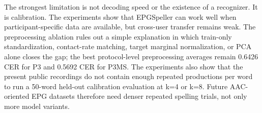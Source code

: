 The strongest limitation is not decoding speed or the existence of a recognizer. It is calibration. The experiments show that EPGSpeller can work well when participant-specific data are available, but cross-user transfer remains weak. The preprocessing ablation rules out a simple explanation in which train-only standardization, contact-rate matching, target marginal normalization, or PCA alone closes the gap; the best protocol-level preprocessing averages remain 0.6426 CER for P3 and 0.5692 CER for P3MS. The experiments also show that the present public recordings do not contain enough repeated productions per word to run a 50-word held-out calibration evaluation at k=4 or k=8. Future AAC-oriented EPG datasets therefore need denser repeated spelling trials, not only more model variants.

